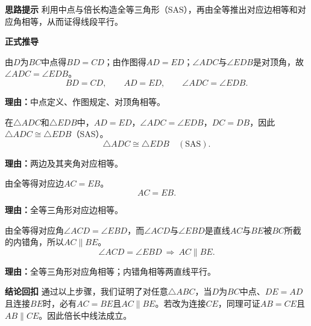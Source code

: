 \begin{proofbox}
	\textbf{\textcolor{CProof}{思路提示}}
	利用中点与倍长构造全等三角形（SAS），再由全等推出对应边相等和对应角相等，从而证得线段平行。

	\medskip
	\textbf{\textcolor{CProof}{正式推导}}
	\begin{description}[style=nextline, leftmargin=2.8em, labelsep=0.5em, itemsep=0.55em]
		\item[\textbf{步骤一（准备条件）：}]
			由$D$为$BC$中点得$BD=CD$；由作图得$AD=ED$；$\angle ADC$与$\angle EDB$是对顶角，故$\angle ADC=\angle EDB$。
			\[
				BD=CD,
				\qquad
				AD=ED,
				\qquad
				\angle ADC=\angle EDB.
			\]
			\par\textbf{理由：}中点定义、作图规定、对顶角相等。
		\item[\textbf{步骤二（全等证明）：}]
			在$\triangle ADC$和$\triangle EDB$中，$AD=ED$，$\angle ADC=\angle EDB$，$DC=DB$，因此$\triangle ADC\cong\triangle EDB$（SAS）。
			\[
				\triangle ADC\cong\triangle EDB\quad(\mathrm{SAS}).
			\]
			\par\textbf{理由：}两边及其夹角对应相等。
		\item[\textbf{步骤三（等长结论）：}]
			由全等得对应边$AC=EB$。
			\[
				AC=EB.
			\]
			\par\textbf{理由：}全等三角形对应边相等。
		\item[\textbf{步骤四（平行结论）：}]
			由全等得对应角$\angle ACD=\angle EBD$，而$\angle ACD$与$\angle EBD$是直线$AC$与$BE$被$BC$所截的内错角，所以$AC\parallel BE$。
			\[
				\angle ACD=\angle EBD\ \Rightarrow\ AC\parallel BE.
			\]
			\par\textbf{理由：}全等三角形对应角相等；内错角相等两直线平行。
	\end{description}

	\medskip
	\textbf{\textcolor{CProof}{结论回扣}}
	通过以上步骤，我们证明了对任意$\triangle ABC$，当$D$为$BC$中点、$DE=AD$且连接$BE$时，必有$AC=BE$且$AC\parallel BE$。若改为连接$CE$，同理可证$AB=CE$且$AB\parallel CE$。因此倍长中线法成立。
\end{proofbox}
